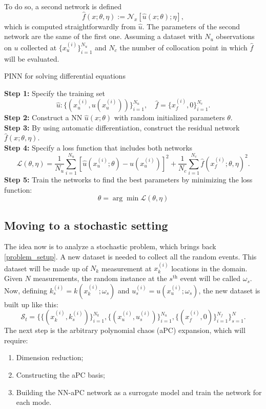 \documentclass[11pt,a4paper]{article}
\begin{document}
To do so, a second network is defined 
\begin{equation}
    \hat{f}(x;\theta,\eta) := \mathcal{N}_x\left[ \hat{u}(x;\theta);\eta \right],
    \label{second_network}
\end{equation}
which is computed straightforwardly from \(\hat{u}\). The parameters of the second network are the same of the first one. 
Assuming a dataset with \(N_u\) observations on \(u\) collected at \(\{ x^{(i)}_u \}^{N_u}_{i=1}\) and \(N_c\) the number of collocation point in which \(\hat{f}\) will be evaluated.
\begin{algorithm}[H]
\caption{PINN for solving differential equations}\label{alg:cap}
\textbf{Step 1:} Specify the training set 
\[
    \hat{u}: \{ (x^{(i)}_u, u(x^{(i)}_u))\}^{N_u}_{i=1}, \quad \hat{f} = \{x^{(i)}_f, 0\}^{N_c}_{i=1}.
\]
\textbf{Step 2:} Construct a NN \(\hat{u}(x;\theta)\) with random initialized parameters \(\theta\). \\
\textbf{Step 3:} By using automatic differentiation, construct the residual network \(\hat{f}(x;\theta, \eta)\). \\
\textbf{Step 4:} Specify a loss function that includes both networks 
\begin{equation}
    \label{loss_fn}
    \mathcal{L}(\theta, \eta) = \frac{1}{N_u} \sum_{i=1}^{N_u} [\hat{u}(x^{(i)}_u; \theta) - u(x^{(i)}_u)]^2+ \frac{1}{N_c} \sum_{i=1}^{N_c}\hat{f}(x_f^{(i)};\theta, \eta)^2.
\end{equation}
\textbf{Step 5:} Train the networks to find the best parameters by minimizing the loss function:
\[
    \theta = \arg \min \mathcal{L}(\theta,\eta)
\]
\end{algorithm}
\subsection{Moving to a stochastic setting}
The idea now is to analyze a stochastic problem, which brings back \eqref{problem_setup}. A new dataset is needed to collect all the random events. This dataset will be made up of \(N_k\) measurement at \(x^{(i)}_k\) locations in the domain. Given \(N\) measurements, the random instance at the \(s^{\text{th}}\) event will be called \(\omega_s\). Now, defining \(k_s^{(i)} = k(x_k^{(i)}; \omega_s)\) and \(u_s^{(i)} = u(x_u^{(i)};\omega_s)\), the new dataset is built up like this:
\[
    \mathcal{S}_t = \{\{(x^{(i)}_k, k^{(i)}_s)\}^{N_k}_{i=1},\{(x^{(i)}_u, u^{(i)}_s)\}^{N_u}_{i=1},\{(x^{(i)}_f,0)\}^{N_f}_{i=1}\}^{N}_{s=1}.
\]    
The next step is the arbitrary polynomial chaos (aPC) expansion, which will require:
\begin{enumerate}
    \item Dimension reduction;
    \item Constructing the aPC basis;
    \item Building the NN-aPC network as a surrogate model and train the network for each mode.
\end{enumerate}
\end{document}
